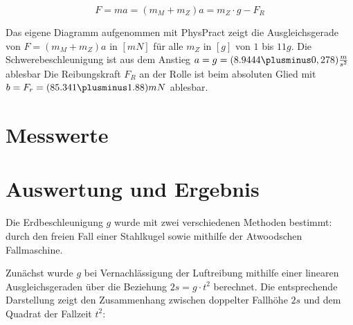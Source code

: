 \documentclass{protokoll}
\begin{document}
\begin{equation}
 F = ma = (m_M + m_Z)a = m_Z\cdot g - F_R 
\end{equation}



Das eigene Diagramm aufgenommen mit PhysPract zeigt die Ausgleichsgerade von $F = (m_M + m_Z)a$ in $[mN]$ für 
alle $m_Z$ in $[g]$ von $1$ bis $11g$. Die Schwerebeschleunigung ist aus dem Anstieg 
$a = g = (8.9444 \plusminus 0,278) \frac{m}{s^2}$ ablesbar Die Reibungskraft $F_R$ an der Rolle 
ist beim absoluten Glied mit $b = F_r = (85.341 \plusminus 1.88) mN$ ablesbar.




\section{Messwerte}





\section{Auswertung und Ergebnis}

Die Erdbeschleunigung $g$ wurde mit zwei verschiedenen Methoden bestimmt: durch den freien Fall einer Stahlkugel sowie mithilfe der Atwoodschen Fallmaschine.

Zunächst wurde $g$ bei Vernachlässigung der Luftreibung mithilfe einer linearen Ausgleichsgeraden über die Beziehung $2s = g\cdot t^2$ berechnet. Die entsprechende Darstellung zeigt den Zusammenhang zwischen doppelter Fallhöhe $2s$ und dem Quadrat der Fallzeit $t^2$:

\end{document}
